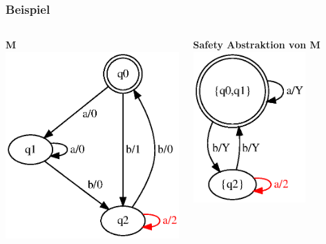\documentclass[10pt]{beamer}
\begin{document}
\begin{frame}
\frametitle{Beispiel}
\begin{columns}[T] %

\begin{column}{.50\textwidth}
\textbf{M}
\includegraphics[width=\textwidth]{images/fsm-example01}
\end{column}%

\begin{column}{0.5\textwidth}
\textbf{Safety Abstraktion von M}
\includegraphics[width=0.7\textwidth]{images/fsm-example01_abs_min}
\end{column}%
\end{columns}
\end{frame}
\end{document}
